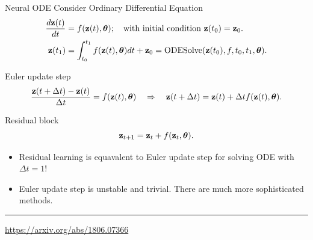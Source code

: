 \begin{frame}{Neural ODE}
	Consider Ordinary Differential Equation    
	\begin{align*}
	    \frac{d \mathbf{z}(t)}{dt} &= f(\mathbf{z}(t), \boldsymbol{\theta}); \quad \text{with initial condition }\mathbf{z}(t_0) = \mathbf{z}_0. \\
	    \mathbf{z}(t_1) &= \int^{t_1}_{t_0} f(\mathbf{z}(t), \boldsymbol{\theta}) d t  + \mathbf{z}_0 = \text{ODESolve}(\mathbf{z}(t_0), f, t_0,t_1, \boldsymbol{\theta}).
	\end{align*}
	\vspace{-0.4cm}
	\begin{block}{Euler update step}
		\vspace{-0.4cm}
		\[
		    \frac{\mathbf{z}(t + \Delta t) - \mathbf{z}(t)}{\Delta t} = f(\mathbf{z}(t), \boldsymbol{\theta}) \quad \Rightarrow \quad \mathbf{z}(t + \Delta t) = \mathbf{z}(t) + \Delta t f(\mathbf{z}(t), \boldsymbol{\theta}).
		\]
		\vspace{-0.5cm}
	\end{block}
	\begin{block}{Residual block}
		\vspace{-0.5cm}
		\[
		    \mathbf{z}_{t+1} = \mathbf{z}_t + f(\mathbf{z}_t, \boldsymbol{\theta}).
		\]
		\vspace{-0.4cm}
	\end{block}
	\begin{itemize}
	 \item Residual learning is equavalent to Euler update step for solving ODE with $\Delta t = 1$!
	 \item Euler update step is unstable and trivial. There are much more sophisticated methods.
	\end{itemize}
	 \vfill
	\hrule\medskip
	{\scriptsize \href{https://arxiv.org/abs/1806.07366}{https://arxiv.org/abs/1806.07366}}   
\end{frame}
